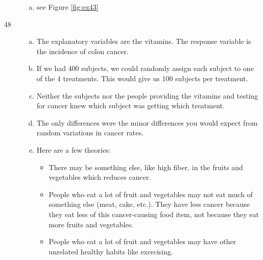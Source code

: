 \documentclass[letterpaper]{exam}
\begin{document}
\begin{description}
\begin{enumerate}[(a)]
          \item see Figure \ref{fig:ex43}
        \end{enumerate}

      \item[48] 
        \begin{enumerate}[(a)]
          \item The explanatory variables are the vitamins.  The response
            variable is the incidence of colon cancer.

          \item If we had 400 subjects, we could randomly assign each subject to
            one of the 4 treatments.  This would give us 100 subjects per
            treatment.

          \item Neither the subjects nor the people providing the vitamins and
            testing for cancer knew which subject was getting which treatment.

          \item The only differences were the minor differences you would expect
            from random variations in cancer rates.

          \item Here are a few theories:
            \begin{itemize}
              \item There may be something else, like high fiber, in the fruits
                and vegetables which reduces cancer.  

              \item People who eat a lot of fruit and vegetables may not eat
                much of something else (meat, cake, etc.).  They have less
                cancer because they eat less of this cancer-causing food item,
                not because they eat more fruits and vegetables.

              \item People who eat a lot of fruit and vegetables may have other
                unrelated healthy habits like exercising.

            \end{itemize}
        \end{enumerate}
  \end{description}
\end{document}
